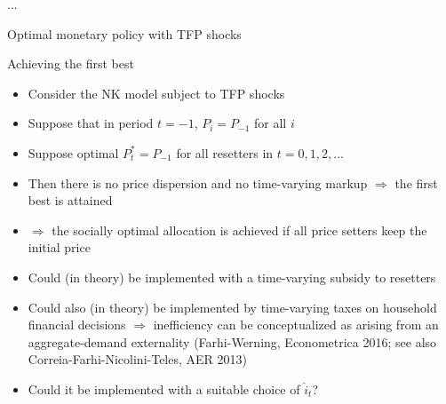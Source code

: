 \documentclass[9pt,xcolor={dvipsnames}]{beamer}
\newcommand{\bit}{\begin{itemize}}
\newcommand{\eit}{\end{itemize}}
\newcommand{\bc}{\color{blue}}
\begin{document}
\begin{frame}{...}


\begin{center}
	\huge Optimal monetary policy with TFP shocks\normalfont
\end{center}

\end{frame}



\begin{frame}{Achieving the first best}

\bit
\setlength\itemsep{1em}
\item Consider the NK model subject to TFP shocks

\item Suppose that in period $t=-1$, $P_{i} = P_{-1}$ for all $i$

\item Suppose optimal $P^*_t = P_{-1}$ for all resetters in $t=0,1,2,...$

\item Then there is no price dispersion and no time-varying markup $\Rightarrow$ the first best is attained

\item $\Rightarrow$ the socially optimal allocation is achieved if all price setters keep the initial price

\item Could (in theory) be implemented with a time-varying subsidy to resetters

\item Could also (in theory) be implemented by time-varying taxes on household financial decisions $\Rightarrow$ inefficiency can be conceptualized as arising from an {\bc aggregate-demand externality} (Farhi-Werning, Econometrica 2016; see also Correia-Farhi-Nicolini-Teles, AER 2013)

\item Could it be implemented with a suitable choice of $\hat i_t$?
\eit

\end{frame}
\end{document}
